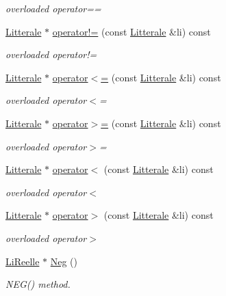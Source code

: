 \begin{DoxyCompactItemize}
\begin{DoxyCompactList}\small\item\em overloaded operator== \end{DoxyCompactList}\item 
\hyperlink{class_litterale}{Litterale} $\ast$ \hyperlink{class_li_reelle_a1374d797764cae650c9fc7b164811278}{operator!=} (const \hyperlink{class_litterale}{Litterale} \&li) const 
\begin{DoxyCompactList}\small\item\em overloaded operator!= \end{DoxyCompactList}\item 
\hyperlink{class_litterale}{Litterale} $\ast$ \hyperlink{class_li_reelle_a49bdd04d02271740a65eca555df3fbcd}{operator$<$=} (const \hyperlink{class_litterale}{Litterale} \&li) const 
\begin{DoxyCompactList}\small\item\em overloaded operator$<$= \end{DoxyCompactList}\item 
\hyperlink{class_litterale}{Litterale} $\ast$ \hyperlink{class_li_reelle_a2b2e23fae32215d966041d06e17edfa2}{operator$>$=} (const \hyperlink{class_litterale}{Litterale} \&li) const 
\begin{DoxyCompactList}\small\item\em overloaded operator$>$= \end{DoxyCompactList}\item 
\hyperlink{class_litterale}{Litterale} $\ast$ \hyperlink{class_li_reelle_a0132f313a6dd67a1f82f8e6373062b41}{operator$<$} (const \hyperlink{class_litterale}{Litterale} \&li) const 
\begin{DoxyCompactList}\small\item\em overloaded operator$<$ \end{DoxyCompactList}\item 
\hyperlink{class_litterale}{Litterale} $\ast$ \hyperlink{class_li_reelle_acc5a25403b3929dbb690ef2a583d68c2}{operator$>$} (const \hyperlink{class_litterale}{Litterale} \&li) const 
\begin{DoxyCompactList}\small\item\em overloaded operator$>$ \end{DoxyCompactList}\item 
\hyperlink{class_li_reelle}{Li\+Reelle} $\ast$ \hyperlink{class_li_reelle_a68bbd97118395e887735caf4d8248d0e}{Neg} ()
\begin{DoxyCompactList}\small\item\em N\+E\+G() method. \end{DoxyCompactList}\item 

\end{DoxyCompactItemize}
